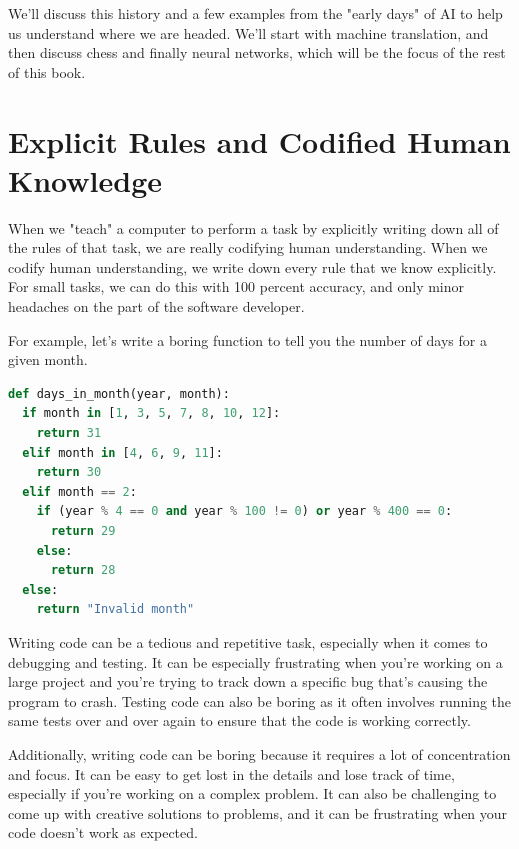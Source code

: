 We’ll discuss this history and a few examples from the "early days" of AI to help us understand where we are headed. We’ll start with machine translation, and then discuss chess and finally neural networks, which will be the focus of the rest of this book.

\section{Explicit Rules and Codified Human Knowledge}

When we "teach" a computer to perform a task by explicitly writing down all of the rules of that task, we are really codifying human understanding. When we codify human understanding, we write down every rule that we know explicitly. For small tasks, we can do this with 100 percent accuracy, and only minor headaches on the part of the software developer.

For example, let's write a boring function to tell you the number of days for a given month.

\begin{lstlisting}[language=Python,style=kaolstplain,linewidth=1.5\textwidth]
def days_in_month(year, month):
  if month in [1, 3, 5, 7, 8, 10, 12]:
    return 31
  elif month in [4, 6, 9, 11]:
    return 30
  elif month == 2:
    if (year % 4 == 0 and year % 100 != 0) or year % 400 == 0:
      return 29
    else:
      return 28
  else:
    return "Invalid month"

\end{lstlisting}


Writing code can be a tedious and repetitive task, especially when it comes to debugging and testing. It can be especially frustrating when you're working on a large project and you're trying to track down a specific bug that's causing the program to crash. Testing code can also be boring as it often involves running the same tests over and over again to ensure that the code is working correctly.

Additionally, writing code can be boring because it requires a lot of concentration and focus. It can be easy to get lost in the details and lose track of time, especially if you're working on a complex problem. It can also be challenging to come up with creative solutions to problems, and it can be frustrating when your code doesn't work as expected.

